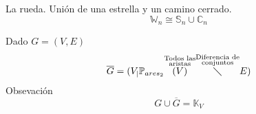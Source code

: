 \documentclass[../main.tex]{subfiles}
\begin{document}
La rueda. Unión de una estrella y un camino cerrado.
\[
	\mathbb{W}_n \cong \mathbb{S}_n \cup \mathbb{C}_n
\]


Dado $G=(V,E)$
\[
	\overline{G} =
	(
		V_| \mathbb{P}_{ares_2}
		\overset
		{
			\substack
			{
				\text{Todos las}\\
				\text{aristas}
			}
		}
		{
			(V)
		}
		\overset
		{
			\substack
			{
				\text{Diferencia de}\\
				\text{conjuntos}
			}
		}
		{
			\diagdown
		}
		E
	)
\]
Obsevación
\[
	G \cup \overline{G}= \mathbb{K}_V
\]
\end{document}
